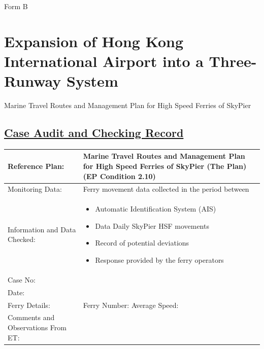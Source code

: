 \documentclass[11pt]{book}
\begin{document}
Form B

\section{Expansion of Hong Kong International Airport into a Three-Runway System}

Marine Travel Routes and Management Plan for High Speed Ferries of SkyPier

\subsection{\ul{Case Audit and Checking Record}}

{\renewcommand{\arraystretch}{1.4}
\begin{table}[htb]
\fontsize{11pt}{15pt}\selectfont
\begin{tabular}{|>{\raggedright}p{38mm}|
p{99mm}<{\raggedright}|}\hline
Reference Plan: & Marine Travel Routes and Management Plan for High Speed Ferries of SkyPier (The Plan) (EP Condition 2.10)
\\ \hline
Monitoring Data: & Ferry movement data collected in the period between
\newline
\ul{%
\\[1.0mm]\hline
Information and Data Checked: &
\begin{minipage}[t]{110mm}
\begin{itemize}
\item Automatic Identification System (AIS)
\item Data Daily SkyPier HSF movements
  \item Record of potential deviations
\item Response provided by the ferry operators
\end{itemize}\vspace*{-1.5ex}
\end{minipage}
\\\hline
Case No: & \textit{%
\\ \hline
Date: & \textit{%
\\ \hline
Ferry Details: & Ferry Number: %
\newline Average Speed: %
\\ \hline
Comments and Observations \newline From ET: & %
}}}
\end{tabular}
\end{table}}
\end{document}
